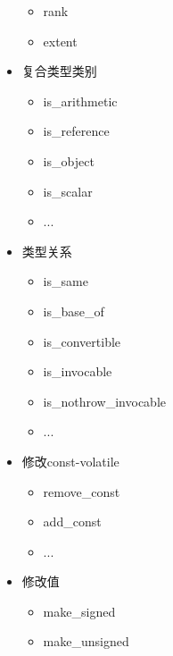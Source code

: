 \begin{itemize}
\begin{itemize}
\item
rank

\item
extent
\end{itemize}

\item
复合类型类别
\begin{itemize}
\item
is\_arithmetic

\item
is\_reference

\item
is\_object

\item
is\_scalar

\item
...
\end{itemize}

\item
类型关系

\begin{itemize}
\item
is\_same

\item
is\_base\_of

\item
is\_convertible

\item
is\_invocable

\item
is\_nothrow\_invocable

\item
...
\end{itemize}

\item
修改const-volatile

\begin{itemize}
\item
remove\_const

\item
add\_const

\item
...
\end{itemize}

\item
修改值

\begin{itemize}
\item
make\_signed

\item
make\_unsigned
\end{itemize}


\end{itemize}
